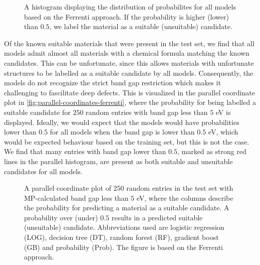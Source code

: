 \begin{figure}[ht!]
    \centering
    
    \vspace*{-130mm}
    \caption{A histogram displaying the distribution of probabilites for all models based on the Ferrenti approach. If the probability is higher (lower) than $0.5$, we label the material as a suitable (unsuitable) candidate.}
    \label{fig:histogram-ferrenti}
\end{figure}

\noindent Of the known suitable materials that were present in the test set, we find that all models admit almost all materials with a chemical formula matching the known candidates.
This can be unfortunate, since this allows materials with unfortunate structures to be labelled as a suitable candidate by all models. Consequently, the models do not recognize the strict band gap restriction which makes it challenging to fascilitate deep defects. This is visualized in the parallel coordinate plot in \autoref{fig:parallel-coordinates-ferrenti}, where the probability for being labelled a suitable candidate for $250$ random entries with band gap less than $5$ eV is displayed. Ideally, we would expect that the models would have probabilities lower than $0.5$ for all models when the band gap is lower than $0.5$ eV, which would be expected behaviour based on the training set, but this is not the case. We find that many entries with band gap lower than $0.5$, marked as strong red lines in the parallel histogram, are present as both suitable and unsuitable candidates for all models. %


\begin{figure}[ht!]
    \centering
    
    \vspace*{-130mm}
    \caption{A parallel coordinate plot of $250$ random entries in the test set with MP-calculated band gap less than $5$ eV, where the columns describe the probability for predicting a material as a suitable candidate. A probability over (under) $0.5$ results in a predicted suitable (unsuitable) candidate. Abbreviations used are logistic regression (LOG), decision tree (DT), random forest (RF), gradient boost (GB) and probability (Prob). The figure is based on the Ferrenti approach.}
    \label{fig:parallel-coordinates-ferrenti}
\end{figure}

